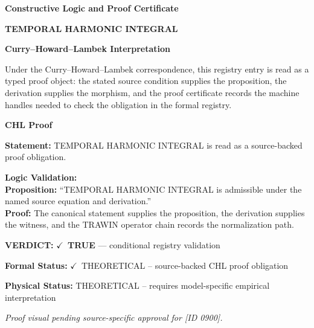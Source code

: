 \clearpage
\begingroup\tzpsupportsetup
\noindent\textbf{\fontsize{10.8pt}{12.8pt}\selectfont [ID 0900] Constructive Logic and Proof Certificate}\par
\noindent\textbf{\fontsize{10pt}{12pt}\selectfont TEMPORAL HARMONIC INTEGRAL}\par
\vspace{0.45em}
\begingroup
\footnotesize
\setlength{\parskip}{0.22em}
\setlength{\parindent}{0pt}
\noindent\textbf{Curry--Howard--Lambek Interpretation}\par
Under the Curry--Howard--Lambek correspondence, this registry entry is read as a typed proof
object: the stated source condition supplies the proposition, the derivation supplies the
morphism, and the proof certificate records the machine handles needed to check the obligation
in the formal registry.

\vspace{0.45em}
\noindent\textbf{CHL Proof}\par
\textbf{Statement:} TEMPORAL HARMONIC INTEGRAL is read as a source-backed proof obligation.

\textbf{Logic Validation:}\\
\textbf{Proposition:} ``TEMPORAL HARMONIC INTEGRAL is admissible under the named source equation and derivation.''\\
\textbf{Proof:} The canonical statement supplies the proposition, the derivation supplies the witness, and the TRAWIN operator chain records the normalization path.

\textbf{VERDICT:} \ensuremath{\checkmark}\ \textbf{TRUE} --- conditional registry validation

\textbf{Formal Status:} \ensuremath{\checkmark}\ THEORETICAL -- source-backed CHL proof obligation

\textbf{Physical Status:} THEORETICAL -- requires model-specific empirical interpretation
\par\vspace{0.45em}
\par
\vfill
\begingroup\footnotesize\itshape
Proof visual pending source-specific approval for [ID 0900].
\par\endgroup
\vfill
\endgroup
\endgroup
